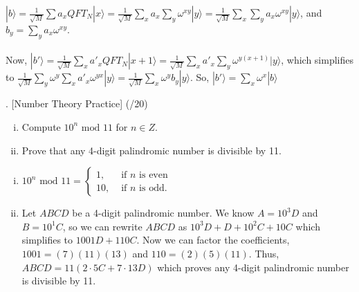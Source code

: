 \documentclass[11pt]{article}
\newenvironment{solution}{\begin{mdframed}[skipabove=\baselineskip,innertopmargin=\baselineskip,innerbottommargin=\baselineskip]
  }{\end{mdframed}}
\begin{document}
\begin{solution}
$|b\rangle = \frac{1}{\sqrt{M}}\sum a_x QFT_N|x\rangle = \frac{1}{\sqrt{M}}\sum_x a_x \sum_y\omega^{xy}|y\rangle = \frac{1}{\sqrt{M}}\sum_x \sum_y a_x \omega^{xy}|y\rangle$, and $b_y = \sum_y a_x \omega^{xy}$. \\\vspace{2em} \\ 
Now, $|b'\rangle =  \frac{1}{\sqrt{M}}\sum_x a'_x QFT_N|x+1\rangle = \frac{1}{\sqrt{M}}\sum_x a'_x  \sum_y \omega^{y(x+1)}|y\rangle$, which simplifies to $\frac{1}{\sqrt{M}}\sum_y \omega^y \sum_x a'_x  \omega^{yx}|y\rangle = \frac{1}{\sqrt{M}}\sum_x \omega^y b_y|y\rangle$. So, $|b'\rangle = \sum_x \omega^x |b\rangle$
\end{solution}

\newpage

. [Number Theory Practice] (/20)

\begin{enumerate}[(i)] 
\item Compute $10^n \text{ mod } 11$ for $n\in Z$. %
\item Prove that any 4-digit palindromic number is divisible by 11. %
\end{enumerate}

\begin{solution}
\begin{enumerate}[(i)]
    \item $	10^n  \text{ mod } 11 = 
    	\begin{cases} 
    	1, & \text{ if $n$ is even }\\
    	10, & \text{ if $n$ is odd. } 
    	\end{cases} $
    \item Let $ABCD$ be a 4-digit palindromic number. We know $A=10^3D$ and $B=10^1C$, so we can rewrite $ABCD$ as $10^3D+D+10^2C+10C$ which simplifies to $1001D+110C$. Now we can factor the coefficients, $1001 = (7)(11)(13)$ and $110 = (2)(5)(11)$. Thus, $ABCD = 11(2\cdot5C + 7\cdot13D)$ which proves any 4-digit palindromic number is divisible by 11.
\end{enumerate}
\end{solution}

\end{document}

